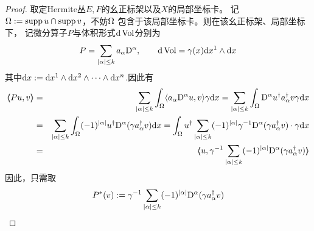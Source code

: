 \begin{proof}
取定Hermite丛$E,F$的幺正标架以及$X$的局部坐标卡。
记$\Omega:=\operatorname{supp} u\cap\operatorname{supp} v$，不妨$\Omega$
包含于该局部坐标卡。则在该幺正标架、局部坐标下，
记微分算子$P$与体积形式$\mathrm{d}\operatorname{Vol}$分别为
$$
  P=\sum_{|\alpha|\leq k}a_\alpha\mathrm{D}^\alpha,
\qquad
  \mathrm{d}\operatorname{Vol}=\gamma(x)\mathrm{d} x^1\wedge\mathrm{d} x
$$
其中$\mathrm{d} x:=\mathrm{d} x^1\wedge\mathrm{d} x^2\wedge\cdots\wedge\mathrm{d} x^n$.因此有
\begin{eqnarray*}
     \ppair{Pu}{v}
&=&
     \sum_{|\afa|\leq k}
     \int_\Omg
       \pair{a_\afa\tD^\afa u}{v}
       \gma\td x
 =
     \sum_{|\afa|\leq k}
     \int_{\Omg}
       \tD^\afa u^\dag a_\afa^\dag v\gma\td x\\
&=&
     \sum_{|\afa|\leq k}
     \int_{\Omg}
       (-1)^{|\afa|}
       u^\dag\tD^\afa(\gma a_\afa^\dag v)\td x
 =
     \int_\Omg
       u^\dag
       \sum_{|\afa|\leq k}
       (-1)^{|\afa|}
       \gma^{-1}\tD^\afa(\gma a_\afa^\dag v)\cdot\gma\td x\\
&=&
     \ppair{u}
           {\gma^{-1}\sum_{|\afa|\leq k}
             (-1)^{|\afa|}
             \tD^\afa
             (\gma a_\afa^\dag v)
           }
\end{eqnarray*}
因此，只需取
$$
  P^*(v)
:=
  \gamma^{-1}\sum_{|\alpha|\leq k}
             (-1)^{|\alpha|}
             \mathrm{D}^\alpha
             (\gamma a_\alpha^\dag v)
$$
\end{proof}


